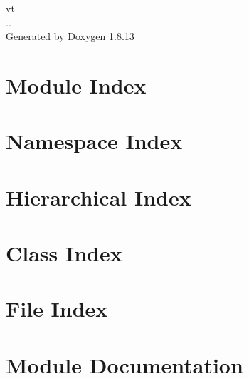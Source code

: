 \documentclass[twoside]{book}
\newcommand{\+}{\discretionary{\mbox{\scriptsize$\hookleftarrow$}}{}{}}
\newcommand{\clearemptydoublepage}{%
  \newpage{\pagestyle{empty}\cleardoublepage}%
}
\begin{document}
\hypersetup{pageanchor=false,
             bookmarksnumbered=true,
             pdfencoding=unicode
            }
\begin{titlepage}
\vspace*{7cm}
\begin{center}%
{\Large vt \\[1ex]\large .. }\\
\vspace*{1cm}
{\large Generated by Doxygen 1.8.13}\\
\end{center}
\end{titlepage}
\clearemptydoublepage
{}
\tableofcontents
\clearemptydoublepage
{}
\hypersetup{pageanchor=true}

\chapter{Module Index}

\chapter{Namespace Index}

\chapter{Hierarchical Index}

\chapter{Class Index}

\chapter{File Index}

\chapter{Module Documentation}





\end{document}
